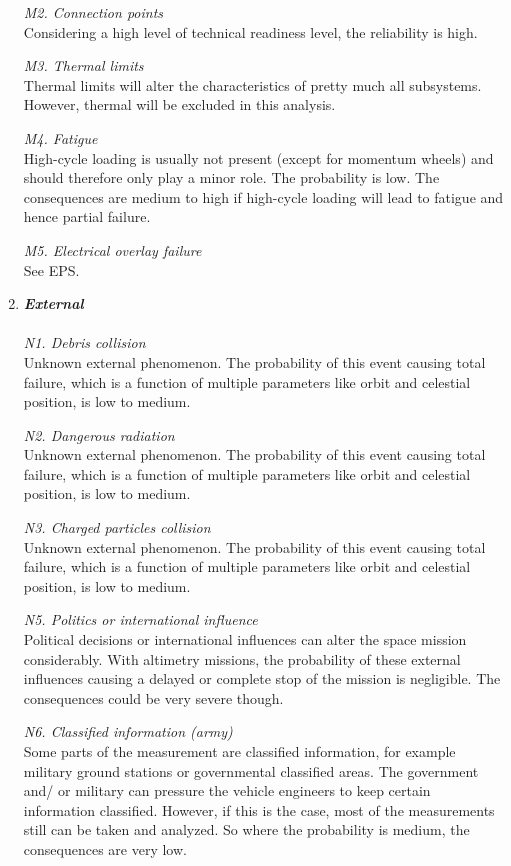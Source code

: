 \begin{enumerate}[A]
\textit{M2. Connection points}\\ 
Considering a high level of technical readiness level, the reliability is high.

\textit{M3. Thermal limits}\\ 
Thermal limits will alter the characteristics of pretty much all subsystems. However, thermal will be excluded in this analysis.

\textit{M4. Fatigue}\\ 
High-cycle loading is usually not present (except for momentum wheels) and should therefore only play a minor role. The probability is low. The consequences are medium to high if high-cycle loading will lead to fatigue and hence partial failure.

\textit{M5. Electrical overlay failure}\\ 
See EPS.

	\item\textbf{\textit{External}} \\\\
\textit{N1. Debris collision}\\ 
Unknown external phenomenon. The probability of this event causing total failure, which is a function of multiple parameters like orbit and celestial position, is low to medium. 

\textit{N2. Dangerous radiation}\\ 
Unknown external phenomenon. The probability of this event causing total failure, which is a function of multiple parameters like orbit and celestial position, is low to medium. 

\textit{N3. Charged particles collision}\\ 
Unknown external phenomenon. The probability of this event causing total failure, which is a function of multiple parameters like orbit and celestial position, is low to medium. 

\textit{N5. Politics or international influence}\\ 
Political decisions or international influences can alter the space mission considerably.  With altimetry missions, the probability of these external influences causing a delayed or complete stop of the mission is negligible. The consequences could be very severe though. 

\textit{N6. Classified information (army)}\\ 
Some parts of the measurement are classified information, for example military ground stations or governmental classified areas. The government and/ or military can pressure the vehicle engineers to keep certain information classified. However, if this is the case, most of the measurements still can be taken and analyzed. So where the probability is medium, the consequences are very low.


\end{enumerate}
